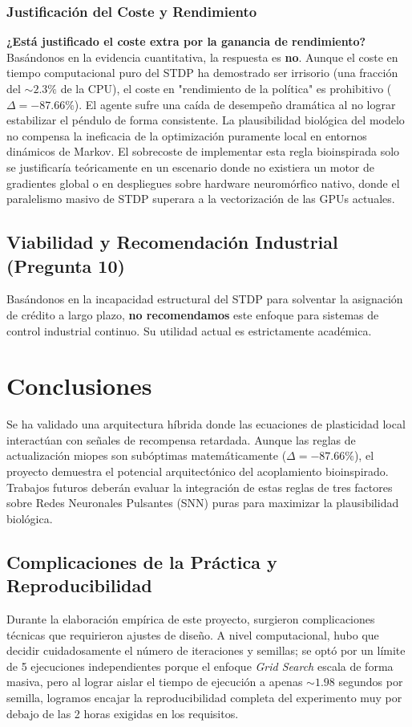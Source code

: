 \documentclass[conference, 10pt]{IEEEtran}
\begin{document}
\subsubsection{Justificación del Coste y Rendimiento}
\textbf{¿Está justificado el coste extra por la ganancia de rendimiento?} Basándonos en la evidencia cuantitativa, la respuesta es \textbf{no}. Aunque el coste en tiempo computacional puro del STDP ha demostrado ser irrisorio (una fracción del $\sim 2.3\%$ de la CPU), el coste en "rendimiento de la política" es prohibitivo ($\Delta = -87.66\%$). El agente sufre una caída de desempeño dramática al no lograr estabilizar el péndulo de forma consistente. La plausibilidad biológica del modelo no compensa la ineficacia de la optimización puramente local en entornos dinámicos de Markov. El sobrecoste de implementar esta regla bioinspirada solo se justificaría teóricamente en un escenario donde no existiera un motor de gradientes global o en despliegues sobre hardware neuromórfico nativo, donde el paralelismo masivo de STDP superara a la vectorización de las GPUs actuales.

\subsection{Viabilidad y Recomendación Industrial (Pregunta 10)}
Basándonos en la incapacidad estructural del STDP para solventar la asignación de crédito a largo plazo, \textbf{no recomendamos} este enfoque para sistemas de control industrial continuo. Su utilidad actual es estrictamente académica.

\section{Conclusiones}
Se ha validado una arquitectura híbrida donde las ecuaciones de plasticidad local interactúan con señales de recompensa retardada. Aunque las reglas de actualización miopes son subóptimas matemáticamente ($\Delta = -87.66\%$), el proyecto demuestra el potencial arquitectónico del acoplamiento bioinspirado. Trabajos futuros deberán evaluar la integración de estas reglas de tres factores sobre Redes Neuronales Pulsantes (SNN) puras para maximizar la plausibilidad biológica.

\subsection{Complicaciones de la Práctica y Reproducibilidad}
Durante la elaboración empírica de este proyecto, surgieron complicaciones técnicas que requirieron ajustes de diseño. A nivel computacional, hubo que decidir cuidadosamente el número de iteraciones y semillas; se optó por un límite de 5 ejecuciones independientes porque el enfoque \textit{Grid Search} escala de forma masiva, pero al lograr aislar el tiempo de ejecución a apenas $\sim 1.98$ segundos por semilla, logramos encajar la reproducibilidad completa del experimento muy por debajo de las 2 horas exigidas en los requisitos.
\end{document}
